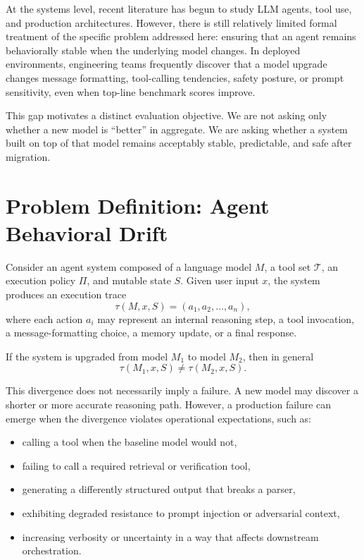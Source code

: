 \documentclass[11pt]{article}
\begin{document}
At the systems level, recent literature has begun to study LLM agents, tool use, and production architectures. However, there is still relatively limited formal treatment of the specific problem addressed here: ensuring that an agent remains behaviorally stable when the underlying model changes. In deployed environments, engineering teams frequently discover that a model upgrade changes message formatting, tool-calling tendencies, safety posture, or prompt sensitivity, even when top-line benchmark scores improve.

This gap motivates a distinct evaluation objective. We are not asking only whether a new model is ``better'' in aggregate. We are asking whether a system built on top of that model remains acceptably stable, predictable, and safe after migration.

\section{Problem Definition: Agent Behavioral Drift}
Consider an agent system composed of a language model $M$, a tool set $\mathcal{T}$, an execution policy $\Pi$, and mutable state $S$. Given user input $x$, the system produces an execution trace
\begin{equation}
\tau(M, x, S) = (a_1, a_2, \dots, a_n),
\end{equation}
where each action $a_i$ may represent an internal reasoning step, a tool invocation, a message-formatting choice, a memory update, or a final response.

If the system is upgraded from model $M_1$ to model $M_2$, then in general
\begin{equation}
\tau(M_1, x, S) \neq \tau(M_2, x, S).
\end{equation}

This divergence does not necessarily imply a failure. A new model may discover a shorter or more accurate reasoning path. However, a production failure can emerge when the divergence violates operational expectations, such as:
\begin{itemize}[leftmargin=*]
    \item calling a tool when the baseline model would not,
    \item failing to call a required retrieval or verification tool,
    \item generating a differently structured output that breaks a parser,
    \item exhibiting degraded resistance to prompt injection or adversarial context,
    \item increasing verbosity or uncertainty in a way that affects downstream orchestration.
\end{itemize}
\end{document}
